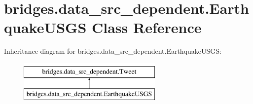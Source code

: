 \hypertarget{classbridges_1_1data__src__dependent_1_1_earthquake_u_s_g_s}{}\section{bridges.\+data\+\_\+src\+\_\+dependent.\+Earthquake\+U\+S\+GS Class Reference}
\label{classbridges_1_1data__src__dependent_1_1_earthquake_u_s_g_s}
Inheritance diagram for bridges.\+data\+\_\+src\+\_\+dependent.\+Earthquake\+U\+S\+GS\+:\begin{figure}[H]
\begin{center}
\leavevmode
\includegraphics[height=2.000000cm]{classbridges_1_1data__src__dependent_1_1_earthquake_u_s_g_s}
\end{center}
\end{figure}
